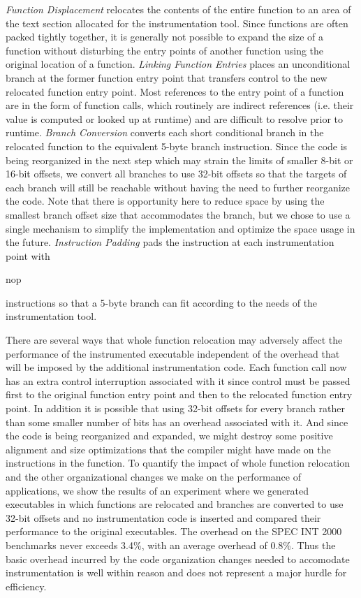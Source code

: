 \textit{Function Displacement} relocates the contents of the entire function to an area of the text section allocated
for the instrumentation tool. Since functions are often packed tightly together, it is generally not possible to
expand the size of a function without disturbing the entry points of another function using the original location of a function. 
\textit{Linking Function Entries} places an unconditional branch at the former function entry point that transfers control
to the new relocated function entry point. Most references to the entry point of a function are in the form of function calls, which
routinely are indirect references (i.e. their value is computed or looked up at runtime) and are difficult to resolve
prior to runtime. \textit{Branch Conversion} converts each short conditional branch in the relocated function to the equivalent
5-byte branch instruction. Since the code is being reorganized in the next step which may strain the limits of
smaller 8-bit or 16-bit offsets, we convert all branches to use 32-bit offsets so that the targets of each branch
will still be reachable without having the need to further reorganize the code. Note that there is opportunity
here to reduce space by using the smallest branch offset size that accommodates the branch, but we chose to use a single 
mechanism to simplify the implementation and optimize the space usage in the future. \textit{Instruction Padding} pads
the instruction at each instrumentation point with \begin{it}nop\end{it} instructions so that a 5-byte branch can fit
 according to the needs of the instrumentation tool. 

There are several ways that whole function relocation may adversely affect 
the performance of the instrumented executable independent of the overhead
that will be imposed by the additional instrumentation code. Each function call
now has an extra control interruption associated with it since control must be passed first to the original function entry
point and then to the relocated function entry point. In addition it is possible that using 32-bit offsets for every branch rather than
some smaller number of bits has an overhead associated with it. And since the code is being reorganized and expanded, 
we might destroy some positive alignment and size optimizations that the compiler might have made on the instructions in the
function. To quantify the impact of whole function relocation and the other organizational changes we make
on the performance of applications, we show the results of an experiment
where we generated executables in which functions are relocated and branches are converted to use 32-bit offsets
and no instrumentation code is inserted and compared 
their performance to the original executables. The overhead on the SPEC INT 2000 benchmarks never exceeds 3.4\%, with an average
overhead of 0.8\%. Thus the basic overhead incurred by the code organization changes needed to accomodate instrumentation is
well within reason and does not represent a major hurdle for efficiency.

